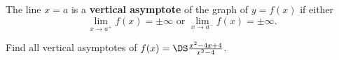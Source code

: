 \newpage

\begin{definition}
The line $x=a$ is a \textbf{vertical asymptote} of the graph of $y=f(x)$ if either
\begin{equation*}
\lim_{x\to a^+}f(x) = \pm\infty \text{ or }\lim_{x\to a^-}f(x) = \pm\infty.
\end{equation*}
\end{definition}



\begin{example}
Find all vertical asymptotes of $f(x)=\DS\frac{x^2-4x+4}{x^2-4}$.
\end{example}
